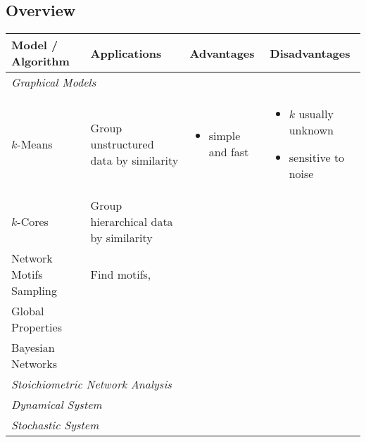 \documentclass[a4paper]{article}
\theoremstyle{plain}
\theoremstyle{definition}
\theoremstyle{remark}
\begin{document}

\begin{landscape}

  \section*{Overview}
  \begin{center}
    \renewcommand{\arraystretch}{1.5}
    \begin{tabular}{l p{6cm} p{7cm} p{7cm}}
      \toprule
      \bfseries Model / Algorithm & \bfseries Applications 
        & \bfseries Advantages & \bfseries Disadvantages \\
      \midrule
      \multicolumn{3}{l}{\itshape Graphical Models} \\
      $k$-Means 
        & Group unstructured data by similarity
        & \begin{itemize}
          \item simple and fast
        \end{itemize}
        & \begin{itemize}
          \item $k$ usually unknown
          \item sensitive to noise
        \end{itemize}
        \\
      $k$-Cores 
        & Group hierarchical data by similarity
        \\
      Network Motifs Sampling
        & Find motifs, 
        \\
      Global Properties \\
      Bayesian Networks \\
      \midrule
      \multicolumn{3}{l}{\itshape Stoichiometric Network Analysis} \\
      \midrule
      \multicolumn{3}{l}{\itshape Dynamical System} \\
      \midrule
      \multicolumn{3}{l}{\itshape Stochastic System} \\
      \bottomrule
    \end{tabular}
  \end{center}

\end{landscape}

\twocolumn

\end{document}
